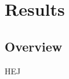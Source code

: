 \chapter{Results}\label{cha:Research}
%

\section{Overview}\label{sec:research:history}
HEJ





%

